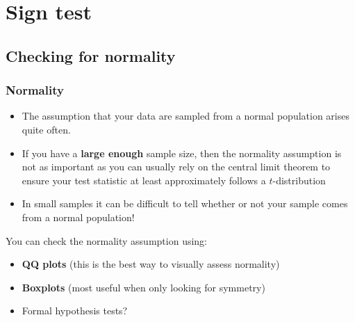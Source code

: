 \documentclass[a4paper]{article}\usepackage[]{graphicx}\usepackage[]{xcolor}
\begin{document}
\section{Sign test}\label{sec:13}
\subsection{Checking for normality}
\subsubsection{Normality}
\begin{itemize}
	\item The assumption that your data are \textcolor{mygreen}{sampled from a normal population} arises quite often.
	\item If you have a \textbf{large enough} sample size, then the normality assumption is not as important as you can usually rely on the central limit theorem to ensure your \textcolor{myred}{test statistic} at least approximately follows a \( t \)-distribution
	\item In \textcolor{mygreen}{small samples} it can be difficult to tell whether or not your sample comes from a normal population!
\end{itemize}
You can check the normality assumption using:
\begin{itemize}
	\item \textbf{QQ plots} (this is the best way to visually assess normality)
	\item \textbf{Boxplots} (most useful when only looking for symmetry)
	\item Formal hypothesis tests?
\end{itemize}
\end{document}
